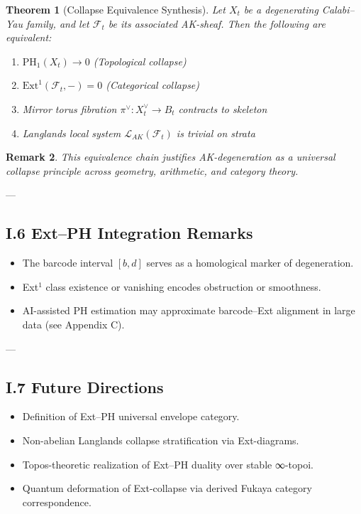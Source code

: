 \documentclass[11pt]{article}
\newtheorem{theorem}{Theorem}[section]
\newtheorem{remark}[theorem]{Remark}
\begin{document}
\begin{theorem}[Collapse Equivalence Synthesis]
Let $X_t$ be a degenerating Calabi–Yau family, and let $\mathcal{F}_t$ be its associated AK-sheaf. Then the following are equivalent:
\begin{enumerate}
  \item $\mathrm{PH}_1(X_t) \to 0$ (Topological collapse)
  \item $\mathrm{Ext}^1(\mathcal{F}_t, -) = 0$ (Categorical collapse)
  \item Mirror torus fibration $\pi^\vee: X_t^\vee \to B_t$ contracts to skeleton
  \item Langlands local system $\mathcal{L}_{AK}(\mathcal{F}_t)$ is trivial on strata
\end{enumerate}
\end{theorem}

\begin{remark}
This equivalence chain justifies AK-degeneration as a universal collapse principle across geometry, arithmetic, and category theory.
\end{remark}

---

\subsection*{I.6 Ext–PH Integration Remarks}

\begin{itemize}
  \item The barcode interval $[b,d]$ serves as a homological marker of degeneration.
  \item Ext${}^1$ class existence or vanishing encodes obstruction or smoothness.
  \item AI-assisted PH estimation may approximate barcode–Ext alignment in large data (see Appendix C).
\end{itemize}

---

\subsection*{I.7 Future Directions}

\begin{itemize}
  \item Definition of Ext–PH universal envelope category.
  \item Non-abelian Langlands collapse stratification via Ext-diagrams.
  \item Topos-theoretic realization of Ext–PH duality over stable ∞-topoi.
  \item Quantum deformation of Ext-collapse via derived Fukaya category correspondence.
\end{itemize}
\end{document}
